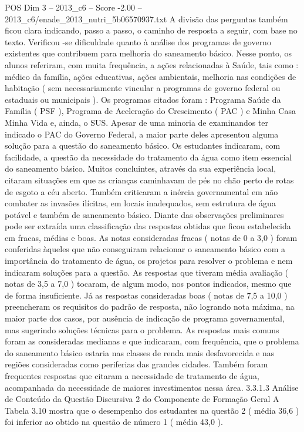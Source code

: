 \begin{textsample}{POS Dim 3 – 2013\_c6 – Score -2.00 – 2013\_c6/enade\_2013\_nutri\_5b06570937.txt}
A divisão das perguntas também ficou clara indicando, passo a passo, o caminho de resposta a seguir, com base no texto.
Verificou -se dificuldade quanto à análise dos programas de governo existentes que contribuem para melhoria do saneamento básico.
Nesse ponto, os alunos referiram, com muita frequência, a ações relacionadas à Saúde, tais como : médico da família, ações educativas, ações ambientais, melhoria nas condições de habitação ( sem necessariamente vincular a programas de governo federal ou estaduais ou municipais ).
Os programas citados foram : Programa Saúde da Família ( PSF ), Programa de Aceleração do Crescimento ( PAC ) e Minha Casa Minha Vida e, ainda, o SUS.
Apesar de uma minoria de examinandos ter indicado o PAC do Governo Federal, a maior parte deles apresentou alguma solução para a questão do saneamento básico.
Os estudantes indicaram, com facilidade, a questão da necessidade do tratamento da água como item essencial do saneamento básico.
Muitos concluintes, através da sua experiência local, citaram situações em que as crianças caminhavam de pés no chão perto de rotas de esgoto a céu aberto.
Também criticaram a inércia governamental em não combater as invasões ilícitas, em locais inadequados, sem estrutura de água potável e também de saneamento básico.
Diante das observações preliminares pode ser extraída uma classificação das respostas obtidas que ficou estabelecida em fracas, médias e boas.
As notas consideradas fracas ( notas de 0 a 3,0 ) foram conferidas àqueles que não conseguiram relacionar o saneamento básico com a importância do tratamento de água, os projetos para resolver o problema e nem indicaram soluções para a questão.
As respostas que tiveram média avaliação ( notas de 3,5 a 7,0 ) tocaram, de algum modo, nos pontos indicados, mesmo que de forma insuficiente.
Já as respostas consideradas boas ( notas de 7,5 a 10,0 ) preencheram os requisitos do padrão de resposta, não logrando nota máxima, na maior parte dos casos, por ausência de indicação de programa governamental, mas sugerindo soluções técnicas para o problema.
As respostas mais comuns foram as consideradas medianas e que indicaram, com frequência, que o problema do saneamento básico estaria nas classes de renda mais desfavorecida e nas regiões consideradas como periferias das grandes cidades.
Também foram frequentes respostas que citaram a necessidade de tratamento de água, acompanhada da necessidade de maiores investimentos nessa área. 3.3.1.3 Análise de Conteúdo da Questão Discursiva 2 do Componente de Formação Geral A Tabela 3.10 mostra que o desempenho dos estudantes na questão 2 ( média 36,6 ) foi inferior ao obtido na questão de número 1 ( média 43,0 ).

\end{textsample}
